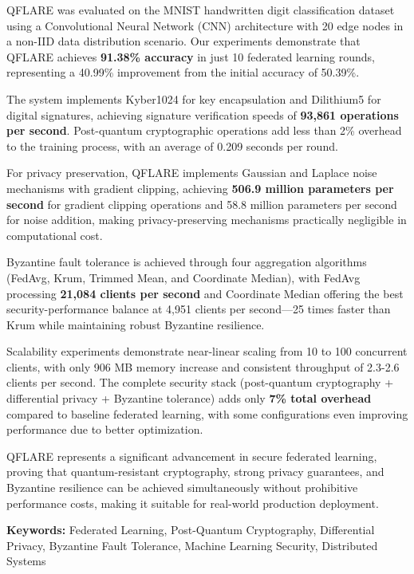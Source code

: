 \documentclass[12pt,a4paper]{article}
\begin{document}
QFLARE was evaluated on the MNIST handwritten digit classification dataset using a Convolutional Neural Network (CNN) architecture with 20 edge nodes in a non-IID data distribution scenario. Our experiments demonstrate that QFLARE achieves \textbf{91.38\% accuracy} in just 10 federated learning rounds, representing a 40.99\% improvement from the initial accuracy of 50.39\%.

The system implements Kyber1024 for key encapsulation and Dilithium5 for digital signatures, achieving signature verification speeds of \textbf{93,861 operations per second}. Post-quantum cryptographic operations add less than 2\% overhead to the training process, with an average of 0.209 seconds per round.

For privacy preservation, QFLARE implements Gaussian and Laplace noise mechanisms with gradient clipping, achieving \textbf{506.9 million parameters per second} for gradient clipping operations and 58.8 million parameters per second for noise addition, making privacy-preserving mechanisms practically negligible in computational cost.

Byzantine fault tolerance is achieved through four aggregation algorithms (FedAvg, Krum, Trimmed Mean, and Coordinate Median), with FedAvg processing \textbf{21,084 clients per second} and Coordinate Median offering the best security-performance balance at 4,951 clients per second---25 times faster than Krum while maintaining robust Byzantine resilience.

Scalability experiments demonstrate near-linear scaling from 10 to 100 concurrent clients, with only 906 MB memory increase and consistent throughput of 2.3-2.6 clients per second. The complete security stack (post-quantum cryptography + differential privacy + Byzantine tolerance) adds only \textbf{7\% total overhead} compared to baseline federated learning, with some configurations even improving performance due to better optimization.

QFLARE represents a significant advancement in secure federated learning, proving that quantum-resistant cryptography, strong privacy guarantees, and Byzantine resilience can be achieved simultaneously without prohibitive performance costs, making it suitable for real-world production deployment.

\textbf{Keywords:} Federated Learning, Post-Quantum Cryptography, Differential Privacy, Byzantine Fault Tolerance, Machine Learning Security, Distributed Systems

\newpage
\tableofcontents
\thispagestyle{plain}
\end{document}
